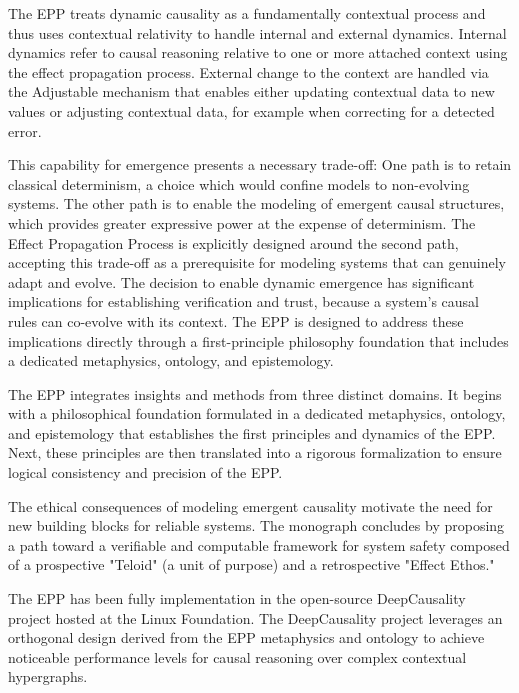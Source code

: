The EPP treats dynamic causality as a fundamentally contextual process and thus uses contextual relativity to handle internal and external dynamics.
Internal dynamics refer to causal reasoning relative to one or more attached context using the effect propagation process.
External change to the context are handled via the Adjustable mechanism that enables either updating contextual data to new values or adjusting contextual data, 
for example when correcting for a detected error.

This capability for emergence presents a necessary trade-off: One path is to retain classical determinism, a choice which would confine models to non-evolving systems. 
The other path is to enable the modeling of emergent causal structures, which provides greater expressive power at the expense of determinism. 
The Effect Propagation Process is explicitly designed around the second path, accepting this trade-off as a prerequisite for modeling systems that can genuinely adapt and evolve.
The decision to enable dynamic emergence has significant implications for establishing verification and trust, because a system’s causal rules can co-evolve with its context. 
The EPP is designed to address these implications directly through a first-principle philosophy foundation that includes a dedicated metaphysics, ontology, and epistemology. 

The EPP integrates insights and methods from three distinct domains. It begins with a philosophical foundation formulated 
in a dedicated metaphysics, ontology, and epistemology that establishes the first principles and dynamics of the EPP. 
Next, these principles are then translated into a rigorous formalization to ensure logical consistency and precision of the EPP. 

The ethical consequences of modeling emergent causality motivate the need for new building blocks for reliable systems. 
The monograph concludes by proposing a path toward a verifiable and computable framework for system safety composed 
of a prospective "Teloid" (a unit of purpose) and a retrospective "Effect Ethos."

The EPP has been fully implementation in the open-source DeepCausality project hosted at the Linux Foundation. 
The DeepCausality project leverages an orthogonal design derived from the EPP metaphysics and ontology to achieve noticeable performance 
levels for causal reasoning over complex contextual hypergraphs. 

\newpage